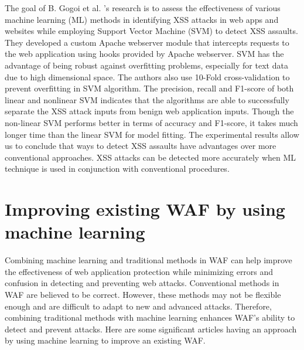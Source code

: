 The goal of B. Gogoi et al. \cite{Gogoi}'s research is to assess the effectiveness of various machine learning (ML) methods in identifying XSS attacks in web apps and websites while employing Support Vector Machine (SVM) to detect XSS assaults. They developed a custom Apache webserver module that intercepts requests to the web application using hooks provided by Apache webserver. SVM has the advantage of being robust against overfitting problems, especially for text data due to high dimensional space. The authors also use 10-Fold cross-validation to prevent overfitting in SVM algorithm. The precision, recall and F1-score of both linear and nonlinear SVM indicates that the algorithms are able to successfully separate the XSS attack inputs from benign web application inputs.  Though the non-linear SVM performs better in terms of accuracy and F1-score, it takes much longer time than the linear SVM for model fitting. The experimental results allow us to conclude that ways to detect XSS assaults have advantages over more conventional approaches. XSS attacks can be detected more accurately when ML technique is used in conjunction with conventional procedures. 
\section{Improving existing WAF by using machine learning}
\label{sec: improving_waf}
\hspace{0.5cm}Combining machine learning and traditional methods in WAF can help improve the effectiveness of web application protection while minimizing errors and confusion in detecting and preventing web attacks. Conventional methods in WAF are believed to be correct. However, these methods may not be flexible enough and are difficult to adapt to new and advanced attacks. Therefore, combining traditional methods with machine learning enhances WAF's ability to detect and prevent attacks.
Here are some significant articles having an approach by using machine learning to improve an existing WAF. 

